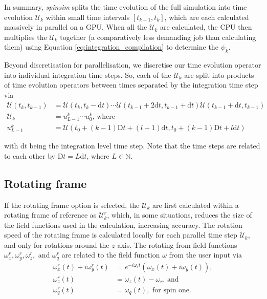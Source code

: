\documentclass{jors}
\begin{document}
		In summary, \emph{spinsim} splits the time evolution of the full simulation into time evolution \(\mathcal{U}_k\) within small time intervals \([t_{k - 1}, t_{k}]\), which are each calculated massively in parallel on a GPU.
		When all the \(\mathcal{U}_k\) are calculated, the CPU then multiplies the \(\mathcal{U}_k\) together (a comparatively less demanding job than calculating them) using Equation \eqref{eq:integration_compilation} to determine the \(\psi_k\).

		Beyond discretisation for parallelisation, we discretise our time evolution operator into individual integration time steps.
		So, each of the \(\mathcal{U}_k\) are split into products of time evolution operators between times separated by the integration time step via
		\begin{align}
			\mathcal{U}(t_k, t_{k-1}) &= \mathcal{U}(t_k, t_k - \mathrm{d}t) \cdots \mathcal{U}(t_{k-1} + 2\mathrm{d}t, t_{k-1} + \mathrm{d}t) \mathcal{U}(t_{k-1} + \mathrm{d}t, t_{k-1})\\
			\mathcal{U}_k &= u^k_{L-1} \cdots u^k_0\textrm{, where}\\
			u^k_{L-1} &= \mathcal{U}(t_0 + (k - 1)\mathrm{D}t + (l + 1)\mathrm{d}t, t_0 + (k - 1)\mathrm{D}t + l\mathrm{d}t)
		\end{align}

		with \(\mathrm{d}t\) being the integration level time step.
		Note that the time steps are related to each other by \(\mathrm{D}t = L\mathrm{d}t\), where \(L\in\mathbb{N}\).

	\subsection{Rotating frame}
		If the rotating frame option is selected, the \(\mathcal{U}_k\) are first calculated within a rotating frame of reference as \(\mathcal{U}^r_k\), which, in some situations, reduces the size of the field functions used in the calculation, increasing accuracy.
		The rotation speed of the rotating frame is calculated locally for each parallel time step \(\mathcal{U}_k\), and only for rotations around the \(z\) axis.
		The rotating from field functions \(\omega^r_x, \omega^r_y, \omega^r_z,\) and \(\omega^r_q\) are related to the field function \(\omega\) from the user input via
		\begin{align}
			\omega^r_x(t) + i\omega^r_y(t) &= e^{-i \omega_r t}(\omega_x(t) + i\omega_y(t)),\\
			\omega^r_z(t) &= \omega_z(t) - \omega_r\textrm{, and}\\
			\omega^r_q(t) &= \omega_q(t), \textrm{ for spin one.}
		\end{align}
		
\end{document}
